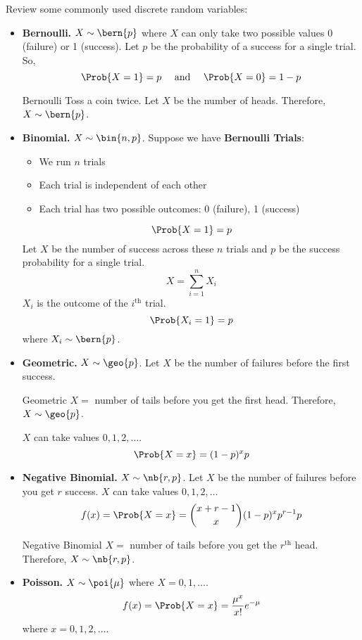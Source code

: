 Review some commonly used discrete random variables:
\begin{itemize}
    \item \textbf{Bernoulli.} $ X \sim \bern{p} $
          where $ X $ can only take two possible values 0 (failure) or 1 (success).
          Let $ p $ be the probability of a success for a single trial. So,
          \[ \Prob{X=1}=p\quad\text{ and }\quad \Prob{X=0}=1-p \]
          \begin{Example}{Bernoulli}{}
              Toss a coin twice. Let $ X $ be the number of heads.
              Therefore, $ X \sim \bern{p} $.
          \end{Example}
    \item \textbf{Binomial.} $ X \sim \bin{n,p} $. Suppose
          we have \textbf{Bernoulli Trials}:
          \begin{itemize}
              \item We run $ n $ trials
              \item Each trial is independent of each other
              \item Each trial has two possible outcomes: 0 (failure), 1 (success)
          \end{itemize}
          \[ \Prob{X=1}=p \]
          Let $ X $ be the number of success across these $ n $ trials
          and $ p $ be the success probability for a single trial.
          \[ X=\sum\limits_{i=1}^{n} X_i \]
          $ X_i $ is the outcome of the $ i^{\text{th}} $ trial.
          \[ \Prob{X_i=1}=p \]
          where $ X_i \sim \bern{p} $.
    \item \textbf{Geometric.} $ X \sim \geo{p} $.
          Let $ X $ be the number of failures before the first success.
          \begin{Example}{Geometric}{}
              $ X = $ number of tails before you get the first
              head. Therefore, $ X \sim \geo{p} $.
          \end{Example}
          $ X $ can take values $ 0,1,2,\ldots $.
          \[ \Prob{X=x}=(1-p)^x p \]
    \item \textbf{Negative Binomial.} $ X \sim \nb{r,p} $.
          Let $ X $ be the number of failures before you get $ r $ success.
          $ X $ can take values $ 0,1,2,\ldots $
          \[ f(x)=\Prob{X=x}=\binom{x+r-1}{x}(1-p)^x p^{r-1}p \]
          \begin{Example}{Negative Binomial}{}
              $ X= $ number of tails before you get the $ r^{\text{th}} $ head.
              Therefore, $ X \sim \nb{r,p} $.
          \end{Example}
    \item \textbf{Poisson.} $ X \sim \poi{\mu} $
          where $ X = 0,1,\ldots $.
          \[ f(x)=\Prob{X=x}=\frac{\mu^x}{x!} e^{-\mu} \]
          where $ x=0,1,2,\ldots $.
\end{itemize}

